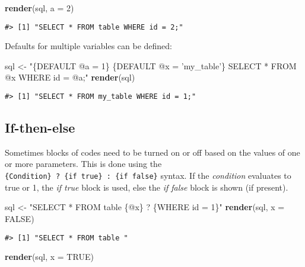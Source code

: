 \documentclass[
]{article}
\newenvironment{Shaded}{\begin{snugshade}}{\end{snugshade}}
\newcommand{\DataTypeTok}[1]{\textcolor[rgb]{0.13,0.29,0.53}{#1}}
\newcommand{\DecValTok}[1]{\textcolor[rgb]{0.00,0.00,0.81}{#1}}
\newcommand{\KeywordTok}[1]{\textcolor[rgb]{0.13,0.29,0.53}{\textbf{#1}}}
\newcommand{\NormalTok}[1]{#1}
\newcommand{\OtherTok}[1]{\textcolor[rgb]{0.56,0.35,0.01}{#1}}
\newcommand{\StringTok}[1]{\textcolor[rgb]{0.31,0.60,0.02}{#1}}
\begin{document}
\begin{Shaded}
\begin{Highlighting}[]
\KeywordTok{render}\NormalTok{(sql, }\DataTypeTok{a =} \DecValTok{2}\NormalTok{)}
\end{Highlighting}
\end{Shaded}

\begin{verbatim}
#> [1] "SELECT * FROM table WHERE id = 2;"
\end{verbatim}

Defaults for multiple variables can be defined:

\begin{Shaded}
\begin{Highlighting}[]
\NormalTok{sql <-}\StringTok{ "\{DEFAULT @a = 1\} \{DEFAULT @x = 'my_table'\} SELECT * FROM @x WHERE id = @a;"}
\KeywordTok{render}\NormalTok{(sql)}
\end{Highlighting}
\end{Shaded}

\begin{verbatim}
#> [1] "SELECT * FROM my_table WHERE id = 1;"
\end{verbatim}

\hypertarget{if-then-else}{%
\subsection{If-then-else}\label{if-then-else}}

Sometimes blocks of codes need to be turned on or off based on the
values of one or more parameters. This is done using the
\texttt{\{Condition\}\ ?\ \{if\ true\}\ :\ \{if\ false\}} syntax. If the
\emph{condition} evaluates to true or 1, the \emph{if true} block is
used, else the \emph{if false} block is shown (if present).

\begin{Shaded}
\begin{Highlighting}[]
\NormalTok{sql <-}\StringTok{ "SELECT * FROM table \{@x\} ? \{WHERE id = 1\}"}
\KeywordTok{render}\NormalTok{(sql, }\DataTypeTok{x =} \OtherTok{FALSE}\NormalTok{)}
\end{Highlighting}
\end{Shaded}

\begin{verbatim}
#> [1] "SELECT * FROM table "
\end{verbatim}

\begin{Shaded}
\begin{Highlighting}[]
\KeywordTok{render}\NormalTok{(sql, }\DataTypeTok{x =} \OtherTok{TRUE}\NormalTok{)}
\end{Highlighting}
\end{Shaded}
\end{document}
